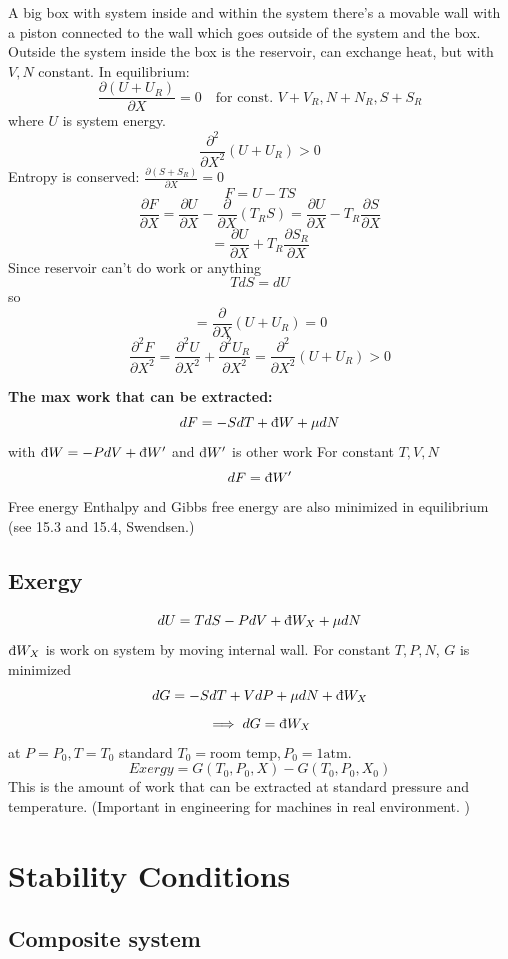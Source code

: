 \documentclass[11pt]{article}
\theoremstyle{definition}
\begin{document}
 A big box with system inside and within the system there's a movable wall with a piston connected to the wall which goes outside of the system and the box. Outside the system inside the box is the reservoir, can exchange heat, but with $ V,N $ constant.
 In equilibrium:
 \[ \frac{\partial (U+U_R)}{\partial X} = 0 \quad \text{for const. } V+V_R, N+N_R, S+S_R\] 
 where $ U $ is system energy.
 \[ \frac{\partial ^2}{\partial X^2} (U+U_R) > 0 \] 
 Entropy is conserved: $ \frac{\partial (S+S_R)}{\partial X} = 0 $ 
 \[ F = U -TS \] 
 \[ \frac{\partial F}{\partial X} = \frac{\partial U}{\partial X} - \frac{\partial }{\partial X}\left(T_R S \right) = \frac{\partial U}{\partial X} - T_R \frac{\partial S}{\partial X}  \] 
 \[ = \frac{\partial U}{\partial X} + T_R \frac{\partial S_R}{\partial X} \] 
 Since reservoir can't do work or anything
 \[ TdS = dU \] 
 so 
 \[ = \frac{\partial }{\partial X} (U+U_R) = 0 \] 
 \[ \frac{\partial ^2F}{\partial X^2} = \frac{\partial ^2U}{\partial X^2} + \frac{\partial ^2 U_R}{\partial X^2} = \frac{\partial ^2}{\partial X^2}(U+U_R) > 0 \] 

\textbf{The max work that can be extracted:} 
\[ dF = -SdT + \text{\dj}W + \mu dN \] 
with $ \text{\dj}W = -PdV + \text{\dj}W' $ and $ \text{\dj}W' $ is other work 
For constant $ T,V,N $ 
\[ dF = \text{\dj}W' \] Free energy 
Enthalpy and Gibbs free energy are also minimized in equilibrium (see 15.3 and 15.4, Swendsen.)

\subsection{Exergy}
\[ dU = TdS - PdV + \text{\dj}W_X + \mu dN \] $ \text{\dj}W_X $ is work on system by moving internal wall.
For constant $ T,P,N $, $ G $ is minimized
\[ dG =  -SdT +VdP + \mu dN + \text{\dj}W_X \] 
\[ \implies dG = \text{\dj}W_X \] 
at $ P=P_0, T=T_0 $ standard $ T_0= \text{room temp} , P_0 = 1 \text{atm.}$ 
\[ Exergy = G(T_0,P_0,X) - G(T_0,P_0,X_0) \] 
This is the amount of work that can be extracted at standard pressure and temperature. (Important in engineering for machines in real environment. )

\pagebreak
\section{Stability Conditions}
\subsection{Composite system}
\end{document}
